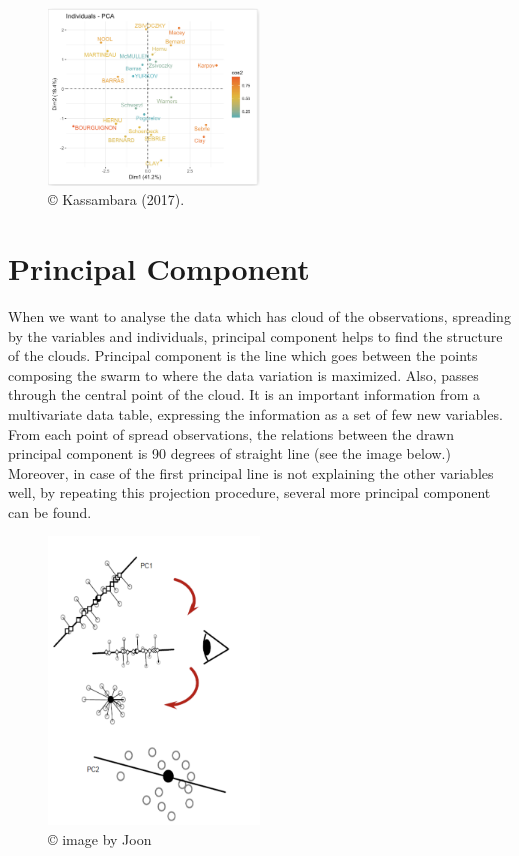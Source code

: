 \documentclass[]{book}
\begin{document}
\begin{figure}
\centering
\includegraphics[width=0.5\textwidth,height=\textheight]{individuals.png}
\caption{© Kassambara (2017).}
\end{figure}

\hypertarget{principal-component}{%
\section{Principal Component}\label{principal-component}}

When we want to analyse the data which has cloud of the observations, spreading by the variables and individuals, principal component helps to find the structure of the clouds.
Principal component is the line which goes between the points composing the swarm to where the data variation is maximized. Also, passes through the central point of the cloud. It is an important information from a multivariate data table, expressing the information as a set of few new variables.
From each point of spread observations, the relations between the drawn principal component is 90 degrees of straight line (see the image below.)
Moreover, in case of the first principal line is not explaining the other variables well, by repeating this projection procedure, several more principal component can be found.

\begin{figure}
\centering
\includegraphics[width=0.5\textwidth,height=\textheight]{PC1_2.png}
\caption{© image by Joon}
\end{figure}
\end{document}
